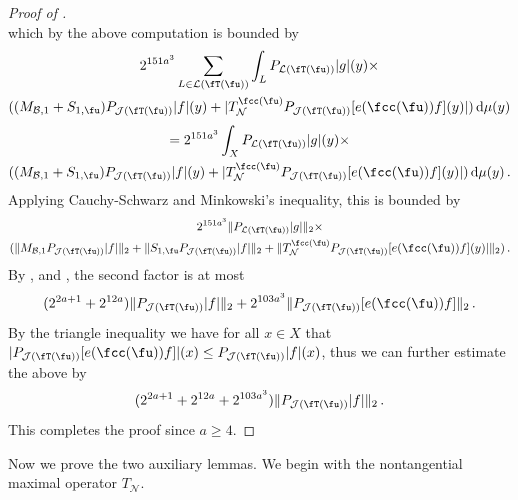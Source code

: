 \begin{proof}[Proof of ]
$$    $$
    which by the above computation is bounded by
    \begin{multline*}
        2^{151a^3} \sum_{L \in \mathcal{L}(\fT(\fu))} \int_L P_{\mathcal{L}(\fT(\fu))}|g|(y) \times \\((M_{\mathcal{B},1}+S_{1,\fu})P_{\mathcal{J}(\fT(\fu))}|f|(y)+|T_{\mathcal{N}}^{\fcc(\fu)}P_{\mathcal{J}(\fT(\fu))}[e(\fcc(\fu))f](y)| ) \, \mathrm{d}\mu(y)
    \end{multline*}
    \begin{multline*}
        = 2^{151a^3} \int_X P_{\mathcal{L}(\fT(\fu))}|g|(y)\times \\((M_{\mathcal{B},1}+S_{1,\fu})P_{\mathcal{J}(\fT(\fu))}|f|(y)+|T_{\mathcal{N}}^{\fcc(\fu)}P_{\mathcal{J}(\fT(\fu))}[e(\fcc(\fu))f](y)| ) \, \mathrm{d}\mu(y)\,.
    \end{multline*}
    Applying Cauchy-Schwarz and Minkowski's inequality, this is bounded by
    \begin{multline*}
        2^{151a^3} \|P_{\mathcal{L}(\fT(\fu))}|g|\|_2 \times \\(\|M_{\mathcal{B},1}P_{\mathcal{J}(\fT(\fu))}|f|\|_2 + \|S_{1,\fu}P_{\mathcal{J}(\fT(\fu))}|f|\|_2 + \|T_{\mathcal{N}}^{\fcc(\fu)}P_{\mathcal{J}(\fT(\fu))}[e(\fcc(\fu))f](y)|\|_2)\,.
    \end{multline*}
    By ,  and , the second factor is at most
    $$
        (2^{2a+1} + 2^{12a})\|P_{\mathcal{J}(\fT(\fu))}|f|\|_2 + 2^{103a^3} \|P_{\mathcal{J}(\fT(\fu))}[e(\fcc(\fu))f]\|_2\,.
    $$
    By the triangle inequality we have for all $x \in X$ that $|P_{\mathcal{J}(\fT(\fu))}[e(\fcc(\fu))f]|(x) \le P_{\mathcal{J}(\fT(\fu))}|f|(x)$, thus we can further estimate the above by
    $$
        (2^{2a+1} + 2^{12a} + 2^{103a^3}) \|P_{\mathcal{J}(\fT(\fu))}|f|\|_2\,.
    $$
    This completes the proof since $a \ge 4$.
\end{proof}

Now we prove the two auxiliary lemmas. We begin with the nontangential maximal operator $T_{\mathcal{N}}$.

